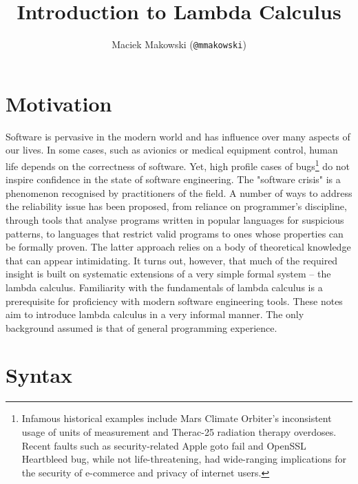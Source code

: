 \documentclass[11pt,twoside,a4paper]{article} %
\begin{document}
\title{Introduction to Lambda Calculus}
\author{Maciek Makowski (\texttt{@mmakowski})}
\maketitle

\section{Motivation}

Software is pervasive in the modern world and has influence over many aspects 
of our lives. In some cases, such as avionics or medical equipment control, 
human life depends on the correctness of software. Yet, high profile cases of 
bugs\footnote{Infamous historical examples include Mars Climate 
Orbiter's inconsistent usage of units of measurement\cite{mco} and Therac-25 
radiation therapy overdoses\cite{therac25}. Recent faults such as
security-related Apple goto fail\cite{cve141266} and OpenSSL Heartbleed
bug\cite{cve140160},
while not life-threatening, had wide-ranging implications for the security of
e-commerce and privacy of internet users.} do not inspire confidence in the 
state of software engineering. The "software crisis" is a phenomenon recognised 
by practitioners of the field. A number of ways to address the reliability issue 
has been proposed, from reliance on programmer's 
discipline\cite{cleancode}\cite{securecoding}, through tools that
analyse programs written in popular languages for suspicious 
patterns\cite{raf04}, to languages that restrict valid programs to ones whose 
properties can be formally proven. The latter approach relies on a body of 
theoretical knowledge that can appear intimidating. It turns out, 
however, that much of the required insight is built on systematic extensions of 
a very simple formal system -- the lambda calculus. Familiarity with the 
fundamentals of lambda calculus is a prerequisite for proficiency with modern 
software engineering tools. These notes aim to introduce lambda calculus in a 
very informal manner. The only background assumed is that of general programming 
experience.

\section{Syntax}
\end{document}
